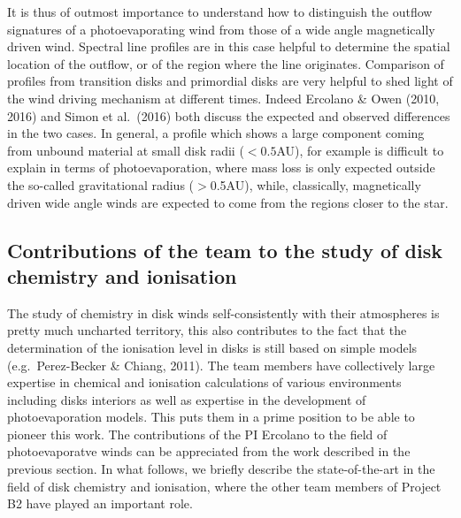 \documentclass[10pt,fleqn,twoside]{article}
\begin{document}
It is thus of outmost importance to understand how to distinguish the
outflow signatures of a photoevaporating wind from those of a wide
angle magnetically driven wind. Spectral line profiles are in this
case helpful to determine the spatial location of the outflow, or of
the region where the line originates. Comparison of profiles from
transition disks and primordial disks are very helpful to shed light
of the wind driving mechanism at different times. Indeed Ercolano \&
Owen (2010, 2016) and Simon et al.\ (2016) both discuss the expected
and observed differences in the two cases. In general, a profile which
shows a large component coming from unbound material at small disk
radii ($<0.5$AU), for example is difficult to explain in terms of
photoevaporation, where mass loss is only expected outside the
so-called gravitational radius ($>$0.5AU), while, classically,
magnetically driven wide angle winds are expected to come from the
regions closer to the star. 


\subsection{Contributions of the team to the study of disk chemistry and ionisation}
The study of chemistry in disk winds self-consistently with their
atmospheres is pretty much uncharted territory, this also contributes
to the fact that the determination of the ionisation level in disks is
still based on simple models (e.g.\ Perez-Becker \& Chiang, 2011). The
team members have collectively large expertise in chemical and ionisation
calculations of various environments including disks interiors as well
as expertise in the development of photoevaporation models. This puts
them in a prime position to be able to pioneer this work. The
contributions of the PI Ercolano to the field of photoevaporatve winds
can be appreciated from the work described in the previous section. In what
follows, we briefly describe the state-of-the-art in the field of disk
chemistry and ionisation, where the other team members of Project B2 have played
an important role.  
\end{document}
